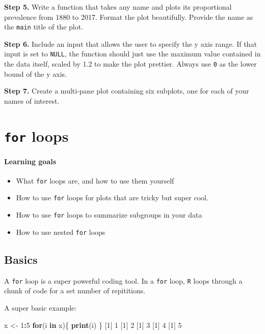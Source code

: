 \documentclass[
]{book}
\newenvironment{Shaded}{\begin{snugshade}}{\end{snugshade}}
\newcommand{\ControlFlowTok}[1]{\textcolor[rgb]{0.13,0.29,0.53}{\textbf{#1}}}
\newcommand{\DecValTok}[1]{\textcolor[rgb]{0.00,0.00,0.81}{#1}}
\newcommand{\KeywordTok}[1]{\textcolor[rgb]{0.13,0.29,0.53}{\textbf{#1}}}
\newcommand{\NormalTok}[1]{#1}
\newcommand{\OperatorTok}[1]{\textcolor[rgb]{0.81,0.36,0.00}{\textbf{#1}}}
\newcommand{\StringTok}[1]{\textcolor[rgb]{0.31,0.60,0.02}{#1}}
\providecommand{\tightlist}{%
  \setlength{\itemsep}{0pt}\setlength{\parskip}{0pt}}
\begin{document}
\textbf{Step 5.} Write a function that takes any name and plots its proportional prevalence from 1880 to 2017. Format the plot beautifully. Provide the name as the \texttt{main} title of the plot.

\textbf{Step 6.} Include an input that allows the user to specify the y axis range. If that input is set to \texttt{NULL}, the function should just use the maximum value contained in the data itself, scaled by 1.2 to make the plot prettier. Always use \texttt{0} as the lower bound of the y axis.

\textbf{Step 7.} Create a multi-pane plot containing six subplots, one for each of your names of interest.

\hypertarget{for-loops}{%
\chapter{\texorpdfstring{\texttt{for} loops}{for loops}}\label{for-loops}}

\hypertarget{learning-goals-15}{%
\subsubsection*{Learning goals}\label{learning-goals-15}}

\begin{itemize}
\tightlist
\item
  What \texttt{for} loops are, and how to use them yourself
\item
  How to use \texttt{for} loops for plots that are tricky but super cool.
\item
  How to use \texttt{for} loops to summarize subgroups in your data
\item
  How to use nested \texttt{for} loops
\end{itemize}

\hypertarget{basics}{%
\section*{Basics}\label{basics}}

A \texttt{for} loop is a super powerful coding tool. In a \texttt{for} loop, \texttt{R} loops through a chunk of code for a set number of repititions.

A super basic example:

\begin{Shaded}
\begin{Highlighting}[]
\NormalTok{x <-}\StringTok{ }\DecValTok{1}\OperatorTok{:}\DecValTok{5}
\ControlFlowTok{for}\NormalTok{(i }\ControlFlowTok{in}\NormalTok{ x)\{}
  \KeywordTok{print}\NormalTok{(i)}
\NormalTok{\}}
\NormalTok{[}\DecValTok{1}\NormalTok{] }\DecValTok{1}
\NormalTok{[}\DecValTok{1}\NormalTok{] }\DecValTok{2}
\NormalTok{[}\DecValTok{1}\NormalTok{] }\DecValTok{3}
\NormalTok{[}\DecValTok{1}\NormalTok{] }\DecValTok{4}
\NormalTok{[}\DecValTok{1}\NormalTok{] }\DecValTok{5}
\end{Highlighting}
\end{Shaded}
\end{document}
